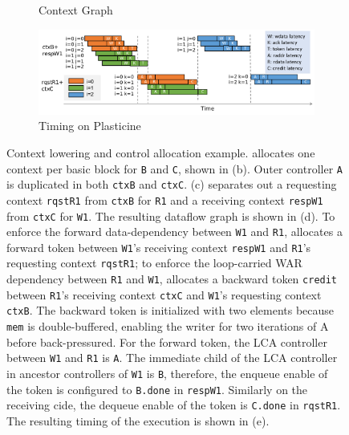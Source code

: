 \begin{figure}
\begin{subfigure}[b]{0.23\textwidth}
\caption{Context Graph}
\end{subfigure}
\begin{subfigure}[b]{0.76\textwidth}
\includegraphics[width=1\textwidth]{figs/plasticinetiming.pdf}
\caption{Timing on Plasticine}
\end{subfigure}
\caption[Context allocation and control allocation]{
  Context lowering and control allocation example.
  \name allocates one context per basic block for \texttt{B} and \texttt{C}, shown in (b). Outer controller \texttt{A} is
  duplicated in both \texttt{ctxB} and \texttt{ctxC}.
  (c) \name separates out a requesting context \texttt{rqstR1} from \texttt{ctxB} for \texttt{R1} 
  and a receiving context \texttt{respW1} from \texttt{ctxC} for \texttt{W1}.
  The resulting dataflow graph is shown in (d). 
  To enforce the forward data-dependency between \texttt{W1} and \texttt{R1}, 
  \name allocates a forward token between \texttt{W1}'s receiving context \texttt{respW1} and
  \texttt{R1}'s requesting context \texttt{rqstR1};
  to enforce the loop-carried WAR dependency between \texttt{R1} and \texttt{W1}, \name allocates a
  backward token \texttt{credit} between \texttt{R1}'s receiving context \texttt{ctxC} and 
  \texttt{W1}'s requesting context \texttt{ctxB}. 
  The backward token is initialized with two elements because \texttt{mem} is double-buffered,
  enabling the writer for two iterations of A before back-pressured.
  For the forward token, the LCA controller between \texttt{W1} and \texttt{R1} is \texttt{A}. The
  immediate child of the LCA controller in ancestor controllers of \texttt{W1} is \texttt{B}, therefore,
  the enqueue enable of the token is configured to \texttt{B.done} in \texttt{respW1}. Similarly on the
  receiving cide, the dequeue enable of the token is \texttt{C.done} in \texttt{rqstR1}.
  The resulting timing of the execution is shown in (e).
}
\label{fig:contextalloc}
\end{figure}


